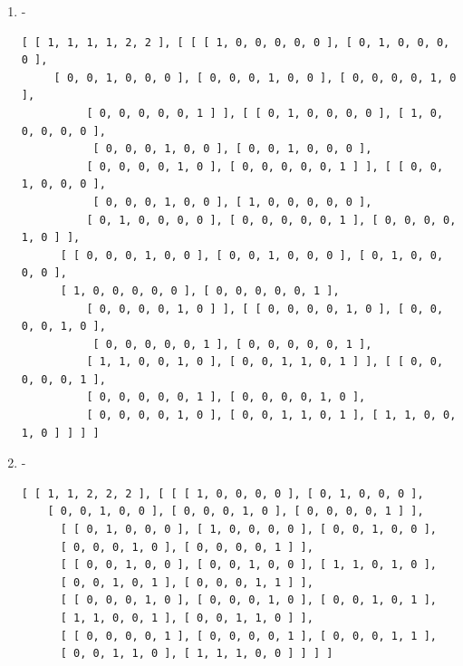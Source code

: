 \documentclass[a4paper, 10pt]{book}
\theoremstyle{definition}
\numberwithin{equation}{chapter}
\begin{document}
\begin{appendices}
\begin{enumerate}
\begin{lstlisting}[numbers=none]
          [ 0, 0, 0, 1, 0, 0 ], [ 0, 0, 0, 0, 0, 1 ] ], [ [ 0, 0, 1, 0, 0, 0 ],
           [ 0, 0, 1, 0, 0, 0 ], [ 0, 0, 0, 0, 0, 2 ], 
          [ 0, 0, 1, 0, 0, 0 ], [ 0, 0, 1, 0, 0, 0 ], [ 1, 1, 0, 1, 1, 0 ] ], 
      [ [ 0, 0, 0, 1, 0, 0 ], [ 0, 0, 0, 0, 1, 0 ], [ 0, 0, 1, 0, 0, 0 ], 
      [ 1, 0, 0, 0, 0, 0 ], [ 0, 1, 0, 0, 0, 0 ], 
          [ 0, 0, 0, 0, 0, 1 ] ], [ [ 0, 0, 0, 0, 1, 0 ], [ 0, 0, 0, 1, 0, 0 ],
           [ 0, 0, 1, 0, 0, 0 ], [ 0, 1, 0, 0, 0, 0 ], 
          [ 1, 0, 0, 0, 0, 0 ], [ 0, 0, 0, 0, 0, 1 ] ], [ [ 0, 0, 0, 0, 0, 1 ], 
          [ 0, 0, 0, 0, 0, 1 ], [ 1, 1, 0, 1, 1, 0 ], 
          [ 0, 0, 0, 0, 0, 1 ], [ 0, 0, 0, 0, 0, 1 ], [ 0, 0, 2, 0, 0, 0 ] ] ] ]
	\end{lstlisting}
	\item -
	\begin{lstlisting}[numbers=none]
	[ [ 1, 1, 1, 1, 2, 2 ], [ [ [ 1, 0, 0, 0, 0, 0 ], [ 0, 1, 0, 0, 0, 0 ],
	 [ 0, 0, 1, 0, 0, 0 ], [ 0, 0, 0, 1, 0, 0 ], [ 0, 0, 0, 0, 1, 0 ],
          [ 0, 0, 0, 0, 0, 1 ] ], [ [ 0, 1, 0, 0, 0, 0 ], [ 1, 0, 0, 0, 0, 0 ],
           [ 0, 0, 0, 1, 0, 0 ], [ 0, 0, 1, 0, 0, 0 ], 
          [ 0, 0, 0, 0, 1, 0 ], [ 0, 0, 0, 0, 0, 1 ] ], [ [ 0, 0, 1, 0, 0, 0 ],
           [ 0, 0, 0, 1, 0, 0 ], [ 1, 0, 0, 0, 0, 0 ], 
          [ 0, 1, 0, 0, 0, 0 ], [ 0, 0, 0, 0, 0, 1 ], [ 0, 0, 0, 0, 1, 0 ] ], 
      [ [ 0, 0, 0, 1, 0, 0 ], [ 0, 0, 1, 0, 0, 0 ], [ 0, 1, 0, 0, 0, 0 ], 
      [ 1, 0, 0, 0, 0, 0 ], [ 0, 0, 0, 0, 0, 1 ], 
          [ 0, 0, 0, 0, 1, 0 ] ], [ [ 0, 0, 0, 0, 1, 0 ], [ 0, 0, 0, 0, 1, 0 ],
           [ 0, 0, 0, 0, 0, 1 ], [ 0, 0, 0, 0, 0, 1 ], 
          [ 1, 1, 0, 0, 1, 0 ], [ 0, 0, 1, 1, 0, 1 ] ], [ [ 0, 0, 0, 0, 0, 1 ], 
          [ 0, 0, 0, 0, 0, 1 ], [ 0, 0, 0, 0, 1, 0 ], 
          [ 0, 0, 0, 0, 1, 0 ], [ 0, 0, 1, 1, 0, 1 ], [ 1, 1, 0, 0, 1, 0 ] ] ] ]
	\end{lstlisting}
	\item -\begin{lstlisting}[numbers=none]
	[ [ 1, 1, 2, 2, 2 ], [ [ [ 1, 0, 0, 0, 0 ], [ 0, 1, 0, 0, 0 ], 
	[ 0, 0, 1, 0, 0 ], [ 0, 0, 0, 1, 0 ], [ 0, 0, 0, 0, 1 ] ], 
      [ [ 0, 1, 0, 0, 0 ], [ 1, 0, 0, 0, 0 ], [ 0, 0, 1, 0, 0 ], 
      [ 0, 0, 0, 1, 0 ], [ 0, 0, 0, 0, 1 ] ], 
      [ [ 0, 0, 1, 0, 0 ], [ 0, 0, 1, 0, 0 ], [ 1, 1, 0, 1, 0 ], 
      [ 0, 0, 1, 0, 1 ], [ 0, 0, 0, 1, 1 ] ], 
      [ [ 0, 0, 0, 1, 0 ], [ 0, 0, 0, 1, 0 ], [ 0, 0, 1, 0, 1 ], 
      [ 1, 1, 0, 0, 1 ], [ 0, 0, 1, 1, 0 ] ], 
      [ [ 0, 0, 0, 0, 1 ], [ 0, 0, 0, 0, 1 ], [ 0, 0, 0, 1, 1 ], 
      [ 0, 0, 1, 1, 0 ], [ 1, 1, 1, 0, 0 ] ] ] ]

\end{lstlisting}
\end{enumerate}
\end{appendices}
\end{document}

